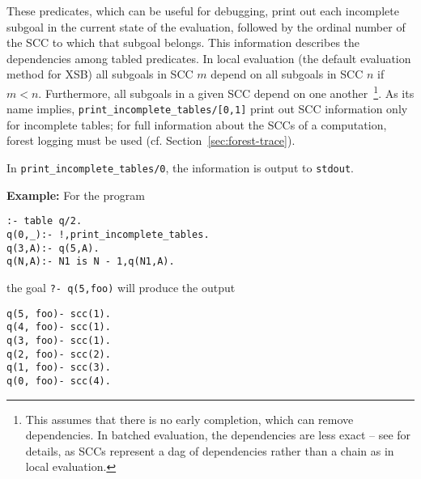 \begin{description}
%
These predicates, which can be useful for debugging, print out each
incomplete subgoal in the current state of the evaluation, followed by
the ordinal number of the SCC to which that subgoal belongs.  This
information describes the dependencies among tabled predicates.  In
local evaluation (the default evaluation method for XSB) all subgoals
in SCC $m$ depend on all subgoals in SCC $n$ if $m < n$.  Furthermore,
all subgoals in a given SCC depend on one another~\footnote{This
  assumes that there is no early completion, which can remove
  dependencies. In batched evaluation, the dependencies are less exact
  -- see \cite{SaSw98} for details, as SCCs represent a dag of
  dependencies rather than a chain as in local evaluation.}.  As its
name implies, {\tt print\_incomplete\_tables/[0,1]} print out SCC
information only for incomplete tables; for full information about the
SCCs of a computation, forest logging must be used
(cf. Section~\ref{sec:forest-trace}).

In {\tt print\_incomplete\_tables/0}, the information is output to
{\tt stdout}.

{\bf Example:} For the program
%
\begin{verbatim}
:- table q/2.
q(0,_):- !,print_incomplete_tables.
q(3,A):- q(5,A).
q(N,A):- N1 is N - 1,q(N1,A).
\end{verbatim}
the goal {\tt ?- q(5,foo)} will produce the output 
%
{\small
\begin{verbatim}
q(5, foo)- scc(1).
q(4, foo)- scc(1).
q(3, foo)- scc(1).
q(2, foo)- scc(2).
q(1, foo)- scc(3).
q(0, foo)- scc(4).
\end{verbatim}
}
%


\end{description}
